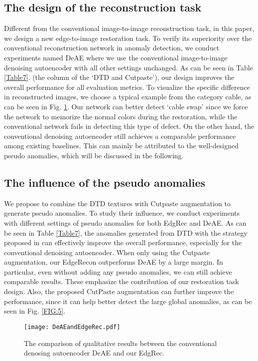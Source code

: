 \documentclass[5p, twocolumn]{elsarticle}[draft]
\begin{document}
\subsection{The design of the reconstruction task}
Different from the conventional image-to-image reconstruction task, in this paper, we design a new edge-to-image restoration task. To verify its superiority over the conventional reconstruction network in anomaly detection, we conduct experiments named DeAE where we use the conventional image-to-image denoising autoencoder with all other settings unchanged. As can be seen in Table \ref{Table7}. (the column of the `DTD and Cutpaste'), our design improves the overall performance for all evaluation metrics. To visualize the specific difference in reconstructed images, we choose a typical example from the category cable, as can be seen in Fig. \ref{FIG:4}. Our network can better detect `cable swap' since we force the network to memorize the normal colors during the restoration, while the conventional network fails in detecting this type of defect. On the other hand, the conventional denoising autoencoder still achieves a comparable performance among existing baselines. This can mainly be attributed to the well-designed pseudo anomalies, which will be discussed in the following.

\subsection{The influence of the pseudo anomalies}
We propose to combine the DTD textures with Cutpaste augmentation to generate pseudo anomalies. To study their influence, we conduct experiments with different settings of pseudo anomalies for both EdgRec and DeAE. As can be seen in Table \ref{Table7}, the anomalies generated from DTD with the strategy proposed in \cite{zavrtanik2021reconstruction} can effectively improve the overall performance, especially for the conventional denoising autoencoder. When only using the Cutpaste augmentation, our EdgeRecon outperforms DeAE by a large margin. In particular, even without adding any pseudo anomalies, we can still achieve comparable results. These emphasize the contribution of our restoration task design. Also, the proposed CutPaste augmentation can further improve the performance, since it can help better detect the large global anomalies, as can be seen in Fig. \ref{FIG:5}.

\begin{figure}
    \centering
		\texttt{[image: DeAEandEdgeRec.pdf]}
	\caption{The comparison of qualitative results between the conventional denosing autoencoder DeAE and our EdgRec.}
	\label{FIG:4}
\end{figure}
\end{document}

